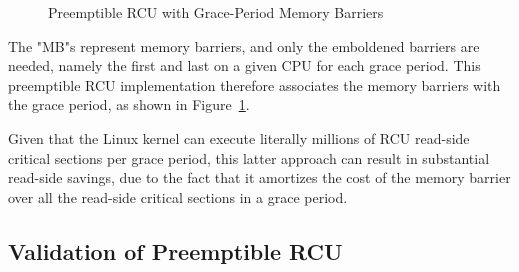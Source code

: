 \begin{figure}[htb]
\begin{center}
\end{center}
\caption{Preemptible RCU with Grace-Period Memory Barriers}
\label{app:rcuimpl:Preemptible RCU with Grace-Period Memory Barriers}
\end{figure}

The "MB"s represent memory barriers, and only the emboldened
barriers are needed, namely the first and last on a given CPU
for each grace period.
This preemptible RCU implementation therefore associates the memory
barriers with the grace period, as shown in
Figure~\ref{app:rcuimpl:Preemptible RCU with Grace-Period Memory Barriers}.

Given that the Linux kernel can execute literally millions of RCU
read-side critical sections per grace period, this latter approach
can result in substantial read-side savings, due to the fact that it
amortizes the cost of the memory barrier over all the read-side critical
sections in a grace period.

\subsection{Validation of Preemptible RCU}
\label{app:rcuimpl:Validation of Preemptible RCU}


